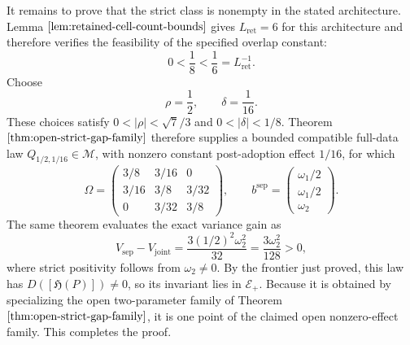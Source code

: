 It remains to prove that the strict class is nonempty in the stated architecture. Lemma \(\ref{lem:retained-cell-count-bounds}\) gives \(L_{\mathrm{ret}}=6\) for this architecture and therefore verifies the feasibility of the specified overlap constant:
\[
 0<\frac18<\frac16=L_{\mathrm{ret}}^{-1}.
\]
Choose
\[
 \rho=\frac12,
 \qquad
 \delta=\frac1{16}.
\]
These choices satisfy \(0<|\rho|<\sqrt7/3\) and \(0<|\delta|<1/8\). Theorem \(\ref{thm:open-strict-gap-family}\) therefore supplies a bounded compatible full-data law \(Q_{1/2,1/16}\in\mathcal M\), with nonzero constant post-adoption effect \(1/16\), for which
\[
 \Omega=
 \begin{pmatrix}
 3/8&3/16&0\\
 3/16&3/8&3/32\\
 0&3/32&3/8
 \end{pmatrix},
 \qquad
 b^{\mathrm{sep}}=
 \begin{pmatrix}
 \omega_1/2\\
 \omega_1/2\\
 \omega_2
 \end{pmatrix}.
\]
The same theorem evaluates the exact variance gain as
\[
 V_{\mathrm{sep}}-V_{\mathrm{joint}}
 =\frac{3(1/2)^2\omega_2^2}{32}
 =\frac{3\omega_2^2}{128}>0,
\]
where strict positivity follows from \(\omega_2\ne0\). By the frontier just proved, this law has \(D([\mathfrak H(P)])\ne0\), so its invariant lies in \(\mathscr E_+\). Because it is obtained by specializing the open two-parameter family of Theorem \(\ref{thm:open-strict-gap-family}\), it is one point of the claimed open nonzero-effect family. This completes the proof.